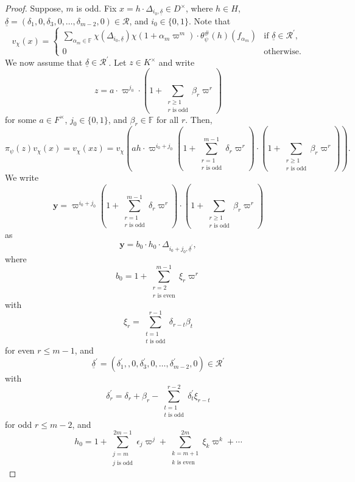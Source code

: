 \documentclass[12pt]{amsart}
\theoremstyle{definition}
\theoremstyle{remark}
\begin{document}
\begin{proof}
Suppose, $m$ is odd. Fix $x=h \cdot \Delta_{i_0, \underline{\delta}} \in D^\times$, where $h \in H$, $\underline{\delta}=(\delta_1, 0, \delta_3, 0, \dots, \delta_{m-2}, 0) \in \mathcal R$, and $i_0 \in \{0,1\}$. Note that 
\[v_{\chi}(x) = 
\begin{cases}
\sum\limits_{\alpha_m \in \mathbb F} \chi(\Delta_{i_0,\underline{\delta}}) \chi(1 + \alpha_m \varpi^m) \cdot \theta_\psi^\#(h)(f_{\alpha_m}) &\text{if $\underline{\delta} \in \mathcal R^\prime $,} \\
0 &\text{otherwise.}
\end{cases} \]
We now assume that $\underline{\delta} \in \mathcal R^\prime $. Let $z \in K^\times$ and write 
\[z= a \cdot \varpi^{j_0} \cdot (1 + \sum\limits_{\substack{r \geq 1  \\    r \text{ is odd} }}\beta_r  \varpi^r )\]
for some $a \in F^\times$, $j_0 \in \{0,1\}$, and $\beta_r \in \mathbb F$ for all $r$. Then,
\[ \pi_\psi(z) v_{\chi}(x) = v_{\chi}(xz) 
= v_{\chi}\left( ah \cdot \varpi^{i_0+j_0} (1 + \sum\limits_{\substack{r = 1  \\    r \text{ is odd} }}^{m-1} \delta_r  \varpi^r ) \cdot (1 + \sum\limits_{\substack{r \geq 1  \\    r \text{ is odd} }}\beta_r  \varpi^r )\right) .\]
We write  
\[\textbf{y}= \varpi^{i_0+j_0} (1 + \sum\limits_{\substack{r = 1  \\    r \text{ is odd} }}^{m-1} \delta_r  \varpi^r ) \cdot (1 + \sum\limits_{\substack{r \geq 1  \\    r \text{ is odd} }}\beta_r  \varpi^r )\]
as 
\[\textbf{y}= b_0 \cdot h_0 \cdot \Delta_{ i_0 + j_0, \underline{\delta}^\prime},\] 
where
\[b_0 = 1 + \sum\limits_{\substack{r = 2 \\    r \text{ is even} }}^{m-1} \xi_r  \varpi^r \]
with 
\[\xi_r=\sum\limits_{\substack{t=1  \\    t \text{ is odd} }}^{r-1} \delta_{r-t}\beta_t\]
for even $r \leq m-1$, and
\[\underline{\delta}^{\prime} = (\delta_1^{\prime},, 0, \delta_3^\prime, 0, \dots , \delta_{m-2}^{\prime},0) \in \mathcal{R}^{\prime}\]
with 
\[\delta_r^{\prime} = \delta_r + \beta_r  - \sum\limits_{\substack{t =1 \\    t \text{ is odd} }}^{r-2} \delta_t^{\prime} \xi_{r-t}\]
for odd $r \leq m-2$, and
\[h_0 = 1 + \sum\limits_{\substack{j =m  \\    j \text{ is odd} }}^{2m-1} \epsilon_j \varpi^j + \sum\limits_{\substack{k = m +1 \\    k \text{ is even} }}^{2m} \xi_k \varpi^k +  \cdots \]

\end{proof}
\end{document}
